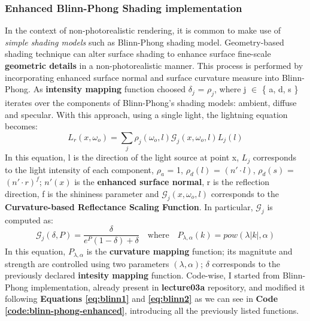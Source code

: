 \subsubsection{Enhanced Blinn-Phong Shading implementation}
In the context of non-photorealistic rendering, it is common to make use of \textit{simple shading models} such as Blinn-Phong shading model. \newline
Geometry-based shading technique can alter surface shading to enhance surface fine-scale \textbf{geometric details} in a non-photorealistic manner. This process is performed by incorporating enhanced surface normal and surface curvature measure into Blinn-Phong.
\newline
As \textbf{intensity mapping} function \cite{referencePaper} choosed $\delta_j$ = $\rho_j$, where j $\in$ \{ a, d, s \} iterates over the components of Blinn-Phong's shading models: ambient, diffuse and specular. \newline
With this approach, using a single light, the lightning equation becomes:
\begin{equation}\label{eq:blinn1}
	L_r(x,\omega_o) = \sum_j \rho_j(\omega_o,l) \mathcal{G}_j(x,\omega_o,l) L_j(l)
\end{equation}
In this equation, l is the direction of the light source at point x, $L_j$ corresponds to the light intensity of each component, $\rho_a$ = 1, $\rho_d(l)$ = $(n'\cdot  l)$, $\rho_d(s)$ = $(n'\cdot  r)^f$; \newline
$n'(x)$ is the \textbf{enhanced surface normal}, r is the reflection direction, f is the shininess parameter and $\mathcal{G}_j(x,\omega_o,l)$ corresponds to the \textbf{Curvature-based Reflectance Scaling Function}. \newline
In particular, $\mathcal{G}_j$ is computed as:
\begin{equation}\label{eq:blinn2}
	\mathcal{G}_j(\delta, P) = \frac{\delta}{e^P (1-\delta) + \delta}\quad\mathrm{where}\quad  P_{\lambda,\alpha}(k) = pow(\lambda |k|, \alpha)
\end{equation}
In this equation, $P_{\lambda,\alpha}$ is the \textbf{curvature mapping} function; its magnitute and strength are controlled using two parameters $(\lambda,\alpha)$; $\delta$ corresponds to the previously declared \textbf{intesity mapping} function.\newline
Code-wise, I started from Blinn-Phong implementation, already present in \textbf{lecture03a} repository, and modified it following \textbf{Equations \ref{eq:blinn1}} and \textbf{\ref{eq:blinn2}} as we can see in \textbf{Code \ref{code:blinn-phong-enhanced}}, introducing all the previously listed functions. \newline
